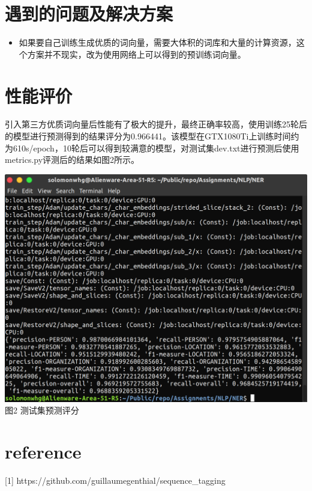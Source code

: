 \documentclass[UTF8]{article}
\begin{document}
 \section{遇到的问题及解决方案}
\begin{itemize}

	\item 如果要自己训练生成优质的词向量，需要大体积的词库和大量的计算资源，这个方案并不现实，改为使用网络上可以得到的预训练词向量。

\end{itemize}
\section{性能评价}

引入第三方优质词向量后性能有了极大的提升，最终正确率较高，使用训练25轮后的模型进行预测得到的结果评分为0.966441。该模型在GTX1080Ti上训练时间约为610s/epoch，10轮后可以得到较满意的模型，对测试集dev.txt进行预测后使用metrics.py评测后的结果如图2所示。
\begin{center}
\includegraphics[scale=0.3]{运行截图.png} \\
	图2 测试集预测评分

\end{center}
\section*{reference}
[1] https://github.com/guillaumegenthial/sequence_tagging
\end{document}
